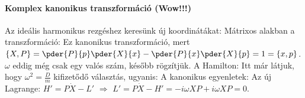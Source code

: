    \paragraph{Komplex kanonikus transzformáció (Wow!!!)}
    
    Az ideális harmonikus rezgéshez keresünk új koordinátákat:
    Mátrixos alakban a transzformáció: 
    Ez kanonikus transzformáció, mert $\{X,P\}=\pder{P}{p}\pder{X}{x}-\pder{P}{x}\pder{X}{p}=1=\{x,p\}$. $\omega$ eddig még csak egy valós szám, később rögzítjük.
   A Hamilton:
    Itt már látjuk, hogy $\omega^2=\frac{D}{m}$ kifizetődő választás, ugyanis:
    A kanonikus egyenletek:
    Az új Lagrange: $H'=P\dot{X}-L'$ $\Rightarrow$ $L'=P\dot{X}-H'=-i\omega XP+i\omega XP=0$.
    
